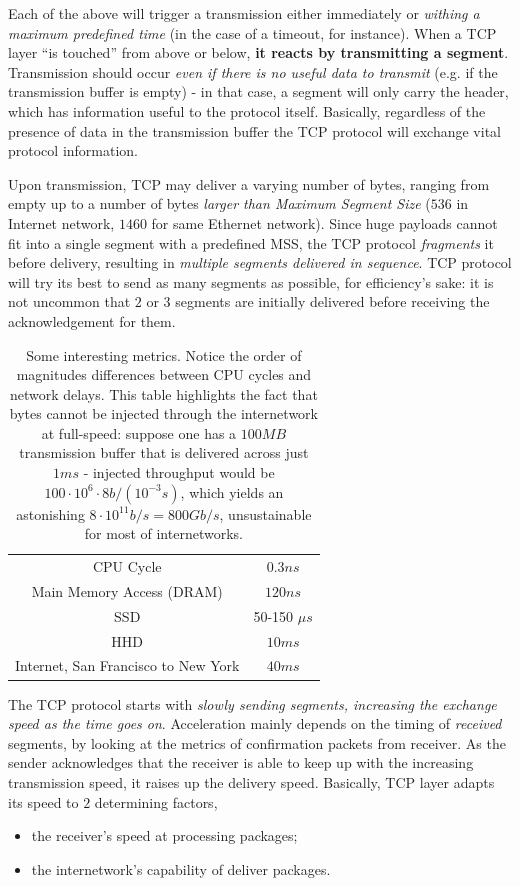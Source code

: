 \documentclass[10pt]{book}
\begin{document}
Each of the above will trigger a transmission either immediately or
\emph{withing a maximum predefined time} (in the case of a timeout, for
instance). When a TCP layer ``is touched'' from above or below, \textbf{it reacts
by transmitting a segment}. Transmission should occur \emph{even if there is no
useful data to transmit} (e.g. if the transmission buffer is empty) \-- in that
case, a segment will only carry the header, which has information useful to the
protocol itself. Basically, regardless of the presence of data in the
transmission buffer the TCP protocol will exchange vital protocol information.

Upon transmission, TCP may deliver a varying number of bytes, ranging from
empty up to a number of bytes \emph{larger than Maximum Segment Size} ($536$ in
Internet network, $1460$ for same Ethernet network). Since huge payloads cannot
fit into a single segment with a predefined MSS, the TCP protocol
\emph{fragments} it before delivery, resulting in \emph{multiple segments
delivered in sequence}. TCP protocol will try its best to send as many segments
as possible, for efficiency's sake: it is not uncommon that $2$ or $3$ segments
are initially delivered before receiving the acknowledgement for them.

\begin{table}[ht]
\centering
\begin{tabular}{cc}
CPU Cycle & $0.3 ns$ \\
Main Memory Access (DRAM) & $120ns$ \\
SSD & 50-150 $\mu s$ \\
HHD & $10 ms$ \\
Internet, San Francisco to New York & $40ms$
\end{tabular}
\caption{Some interesting metrics. Notice the order of magnitudes differences
between CPU cycles and network delays. This table highlights the fact that
bytes cannot be injected through the internetwork at full\--speed: suppose one
has a $100MB$ transmission buffer that is delivered across just $1ms$ \--
injected throughput would be $100 \cdot 10^6 \cdot 8 b/(10^{-3} s)$, which
yields an astonishing $8 \cdot 10^{11} b/s = 800 Gb/s$, unsustainable for most
of internetworks.}
\label{tab:SomeMetrics}
\end{table}
\bigskip

The TCP protocol starts with \emph{slowly sending segments, increasing the exchange
speed as the time goes on}. Acceleration mainly depends on the timing of
\emph{received} segments, by looking at the metrics of confirmation packets
from receiver. As the sender acknowledges that the receiver is able to keep up
with the increasing transmission speed, it raises up the delivery speed. Basically, TCP layer adapts its speed to $2$ determining factors,
\begin{itemize}
    \item the receiver's speed at processing packages;
    \item the internetwork's capability of deliver packages.
\end{itemize}
\end{document}
